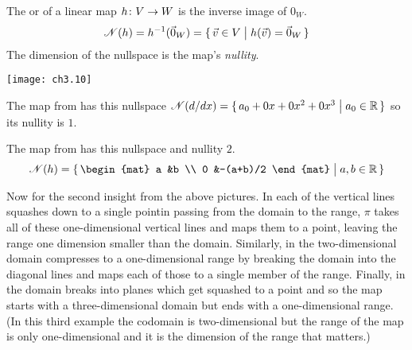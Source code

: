 \begin{definition}
The 
or  of a linear map
\( \mbox{$h\colon V\to W$} \) is the inverse image of $0_W$.
\begin{equation*}
  \mathscr{N}(h)=h^{-1}(\vec{0}_W)=\mbox{$\{\,\vec{v}\in V\bigm| h(\vec{v})=\vec{0}_W\,\}$}
\end{equation*}
The dimension of the nullspace is the map's
{\em nullity}.
\end{definition}

\begin{center}
  \texttt{[image: ch3.10]}
\end{center}

\begin{example}
The map from  has this nullspace
\( \mathscr{N}(d/dx)=\mbox{$\{\,a_0+0x+0x^2+0x^3\bigm| a_0\in\mathbb{R}\,\}$} \)
so its nullity is $1$.
\end{example}

\begin{example}
The map from 
has this nullspace and nullity $2$.
\begin{equation*}
   \nullspace{h}=\set{\begin{mat}
                         a  &b          \\
                         0  &-(a+b)/2
                      \end{mat}\suchthat a,b\in\Re}
\end{equation*}
\end{example}

Now for the second insight from the above pictures.
In  each of the vertical lines  
squashes down 
to a single point\Dash in passing from the domain to the range, $\pi$
takes all of these one-dimensional vertical lines and maps them
to a point,
leaving the range one dimension smaller than the domain.
Similarly, in  the
two-dimensional domain compresses to a one-dimensional range by breaking 
the domain into the diagonal lines 
and maps each of those to a single member of the range.
Finally, in 
the domain breaks into planes which get
squashed to a point and so the map starts with a three-dimensional domain
but ends with a
one-dimensional range. 
(In this third example the codomain is
two-dimensional but the range of the map is only one-dimensional and it is
the dimension of the range that matters.)

